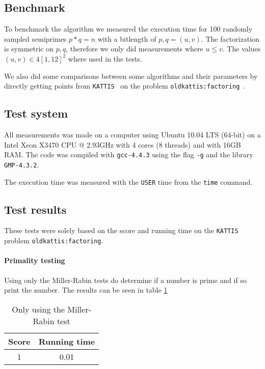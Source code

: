 \subsection{Benchmark}
To benchmark the algorithm we measured the execution time for 100 randomly sampled 
semiprimes $p*q=n$ with a bitlength of $p,q=(u,v)$.
The factorization is symmetric on $p,q$, therefore we only did measurements 
where $u \le v$.
The values $(u,v) \in 4[1,12]^2$ where used in the tests.

We also did some comparisons between some algorithms and their parameters by 
directly getting points from \texttt{KATTIS}~\cite{kattis} on the problem 
\texttt{oldkattis:factoring}~\cite{factoring}.

\subsection{Test system}
All measurements was made on a computer using Ubuntu 10.04 LTS (64-bit)
on a Intel Xeon X3470 CPU @ 2.93GHz with 4 cores (8 threads) and with 16GB RAM. 
The code was compiled with \texttt{gcc-4.4.3} using the flag \texttt{-g} and 
the library \texttt{GMP-4.3.2}.

The execution time was measured with the \texttt{USER} time from the 
\texttt{time} command.

\subsection{Test results}
These tests were solely based on the score and running time on  the 
\texttt{KATTIS} problem \texttt{oldkattis:factoring}.

\paragraph{Primality testing}
Using only the Miller-Rabin tests do determine if a number is prime and
if so print the number. The results can be seen in table
\ref{table:miller-rabin}

\begin{table}[h!]
    \centering
    \begin{tabular}{|c|c|}
    \hline
    \textbf{Score} & \textbf{Running time} \\ \hline
    1              & 0.01                  \\ \hline
    \end{tabular}
    \caption{Only using the Miller-Rabin test}
    \label{table:miller-rabin}
\end{table}


